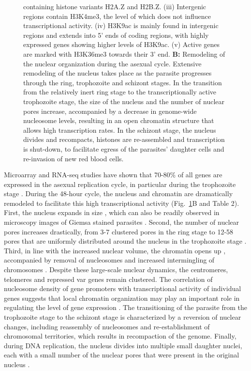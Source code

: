 \begin{figure}
{ containing histone variants H2A.Z and H2B.Z. (iii) Intergenic regions contain
 H3K4me3, the level of which does not influence transcriptional activity. (iv)
 H3K9ac is mainly found in intergenic regions and extends into 5’ ends of
 coding regions, with highly expressed genes showing higher levels of H3K9ac.
 (v) Active genes are marked with H3K36me3 towards their 3’ end. \textbf{B:}
 Remodeling
 of the nuclear organization during the asexual cycle. Extensive remodeling of
 the nucleus takes place as the parasite progresses through the ring,
 trophozoite and schizont stages. In the transition from the relatively inert
 ring stage to the transcriptionally active trophozoite stage, the size of the
 nucleus and the number of nuclear pores increase, accompanied by a decrease
 in genome-wide nucleosome levels, resulting in an open chromatin structure
 that allows high transcription rates. In the schizont stage, the nucleus
 divides and recompacts, histones are re-assembled and transcription is
 shut-down, to facilitate egress of the parasites’ daughter cells and
 re-invasion of new red blood cells.}
\label{fig:final}
\end{figure}

Microarray and RNA-seq studies have shown that 70-80\% of all genes are
expressed in the asexual replication cycle, in particular during the
trophozoite stage \citep{bunnik:polysome, leroch:discovery, otto:new}.
During the 48-hour cycle, the nucleus and
chromatin are dramatically remodeled to facilitate this high transcriptional
activity (Fig.~\ref{fig:final}B and Table 2). First, the nucleus expands in size
\citep{weiner:3d}, which
can also be readily observed in microscopy images of Giemsa stained parasites
\citep{ay:three-dimensional}. Second, the number of nuclear pores increases 
drastically, from 3-7
clustered pores in the ring stage to 12-58 pores that are uniformly
distributed around the nucleus in the trophozoite stage \citep{weiner:3d}.
Third, in line
with the increased nuclear volume, the chromatin opens up
\citep{ay:three-dimensional, weiner:3d}, accompanied
by removal of nucleosomes \citep{bunnik:DNA-encoded, ponts:nucleosome}
 and increased intermingling of chromosomes
\citep{ay:three-dimensional}. Despite these large-scale nuclear dynamics, the centromeres, telomeres
and repressed var genes remain clustered. The correlation of nucleosome
density of gene promoters with transcriptional activity of individual genes
suggests that local chromatin organization may play an important role in
regulating the level of gene expression \citep{bunnik:DNA-encoded}. The transitioning of the
parasite from the trophozoite stage to the schizont stage is characterized by
a reversion of nuclear changes, including reassembly of nucleosomes and
re-establishment of chromosomal territories, which results in recompaction of
the genome. Finally, during DNA replication, the nucleus divides into multiple
small daughter nuclei, each with a small number of the nuclear pores that were
present in the original nucleus \citep{weiner:3d}.

